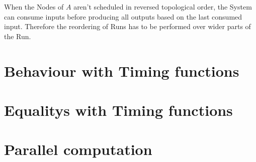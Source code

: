 When the Nodes of \(A\) aren't scheduled in reversed topological order, the System can consume inputs before producing all outputs based on the last consumed input.
Therefore the reordering of Runs has to be performed over wider parts of the Run.

\section{Behaviour with Timing functions}
\section{Equalitys with Timing functions}
\section{Parallel computation}
